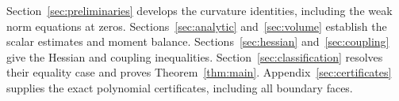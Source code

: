 Section~\ref{sec:preliminaries} develops the curvature identities,
including the weak norm equations at zeros. Sections~\ref{sec:analytic}
and~\ref{sec:volume} establish the scalar estimates and moment balance.
Sections~\ref{sec:hessian} and~\ref{sec:coupling} give the Hessian and
coupling inequalities. Section~\ref{sec:classification} resolves their
equality case and proves Theorem~\ref{thm:main}.
Appendix~\ref{sec:certificates} supplies the exact polynomial
certificates, including all boundary faces.
